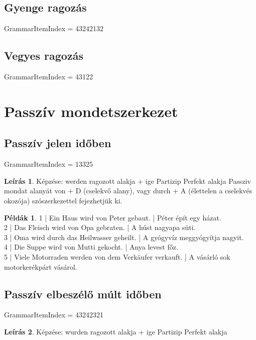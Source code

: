 \documentclass{article}
\theoremstyle{definition}
\newtheorem*{exmp}{Példák}
\newtheorem*{desc}{Leírás}
\begin{document}
\subsection{Gyenge ragozás}

GrammarItemIndex = 43242132

\subsection{Vegyes ragozás}

GrammarItemIndex = 43122

\section{Passzív mondetszerkezet}

\subsection{Passzív jelen időben}

GrammarItemIndex = 13325

\begin{desc}
Képzése: werden ragozott alakja + ige Partizip Perfekt alakja
Passziv mondat alanyát von + D (cselekvő alany), vagy durch + A (élettelen a cselekvés okozója) szószerkezettel fejezhetjük ki.
\end{desc}

\begin{exmp}
1 | Ein Haus wird von Peter gebaut. | Péter épít egy házat.\\
2 | Das Fleisch wird von Opa gebraten. | A húst nagyapa süti.\\
3 | Oma wird durch das Heilwasser geheilt. | A gyógyvíz meggyógyítja nagyit.\\
4 | Die Suppe wird von Mutti gekocht. | Anya levest főz.\\
5 | Viele Motorraden werden von dem Verkäufer verkauft. | A vásárló sok motorkerékpárt vásárol.\\
\end{exmp}

\subsection{Passzív elbeszélő múlt időben}

GrammarItemIndex = 43242321

\begin{desc}
Képzése: wurden ragozott alakja + ige Partizip Perfekt alakja
\end{desc}
\end{document}
